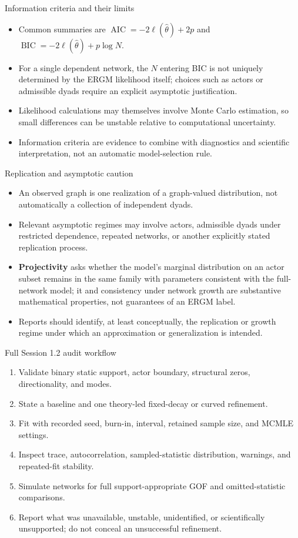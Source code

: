 \documentclass[aspectratio=169,11pt]{beamer}
\newcommand{\term}[1]{\textbf{\color{nupurple}#1}}
\begin{document}
\begin{frame}{Information criteria and their limits}
\begin{itemize}
\item Common summaries are $\operatorname{AIC}=-2\ell(\hat\theta)+2p$ and $\operatorname{BIC}=-2\ell(\hat\theta)+p\log N$.
\item For a single dependent network, the $N$ entering BIC is not uniquely determined by the ERGM likelihood itself; choices such as actors or admissible dyads require an explicit asymptotic justification.
\item Likelihood calculations may themselves involve Monte Carlo estimation, so small differences can be unstable relative to computational uncertainty.
\item Information criteria are evidence to combine with diagnostics and scientific interpretation, not an automatic model-selection rule.
\end{itemize}
\end{frame}

\begin{frame}{Replication and asymptotic caution}
\begin{itemize}
\item An observed graph is one realization of a graph-valued distribution, not automatically a collection of independent dyads.
\item Relevant asymptotic regimes may involve actors, admissible dyads under restricted dependence, repeated networks, or another explicitly stated replication process.
\item \term{Projectivity} asks whether the model's marginal distribution on an actor subset remains in the same family with parameters consistent with the full-network model; it and consistency under network growth are substantive mathematical properties, not guarantees of an ERGM label.
\item Reports should identify, at least conceptually, the replication or growth regime under which an approximation or generalization is intended.
\end{itemize}
\end{frame}

\begin{frame}{Full Session 1.2 audit workflow}
\begin{enumerate}
\item Validate binary static support, actor boundary, structural zeros, directionality, and modes.
\item State a baseline and one theory-led fixed-decay or curved refinement.
\item Fit with recorded seed, burn-in, interval, retained sample size, and MCMLE settings.
\item Inspect trace, autocorrelation, sampled-statistic distribution, warnings, and repeated-fit stability.
\item Simulate networks for full support-appropriate GOF and omitted-statistic comparisons.
\item Report what was unavailable, unstable, unidentified, or scientifically unsupported; do not conceal an unsuccessful refinement.
\end{enumerate}
\end{frame}
\end{document}

